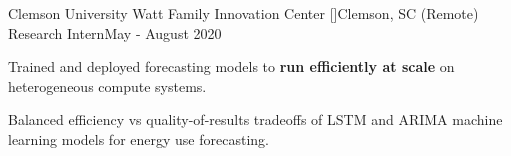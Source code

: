 \resumeSubheading
{Clemson University Watt Family Innovation Center [\href{https://www.clemson.edu/centers-institutes/watt/}{}]}{Clemson, SC (Remote)}
{Research Intern}{May - August 2020}
\resumeItemListStart
    \item Trained and deployed forecasting models to \textbf{run efficiently at scale} on heterogeneous compute systems.
    \item Balanced efficiency vs quality-of-results tradeoffs of LSTM and ARIMA machine learning models for energy use forecasting.
\resumeItemListEnd



\resumeSubHeadingListEnd
\vspace{-6mm}
